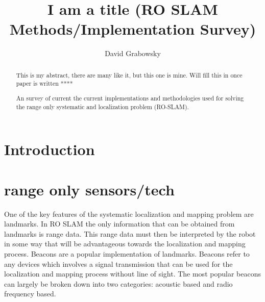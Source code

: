 \documentclass[conference]{IEEEtran}
\begin{document}
	
	\title{I am a title (RO SLAM Methods/Implementation Survey) }
	
	
	
	\author{David Grabowsky}
	
	
	
	
	
	
	
	
	
	
	\maketitle
	
	
	
	
	
	\begin{abstract}
		
		
		
		
		
		This is my abstract, there are many like it, but this one is mine. Will fill this in once paper is written ****
		
		
		
		An survey of current the current implementations and methodologies used for solving the range only systematic and localization problem (RO-SLAM). 
		
		
		
	\end{abstract}
	
	
	
	
	
	
	
	\section{Introduction} 
	
	
	
	\section{range only sensors/tech}
	
	One of the key features of the systematic localization and mapping problem are landmarks. In RO SLAM the only information that can be obtained from landmarks is range data. This range data must then be interpreted by the robot in some way that will be advantageous towards the localization and mapping process. Beacons are a popular implementation of landmarks. Beacons refer to any devices which involves a signal transmission that can be used for the localization and mapping process without line of sight. The most popular beacons can largely be broken down into two categories: acoustic based and radio frequency based.
	
\end{document}
